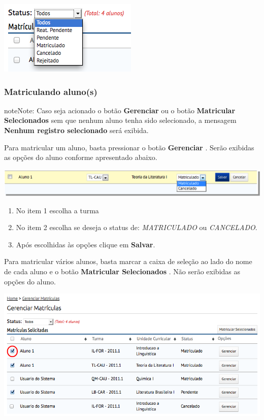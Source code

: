 \documentclass[letterpaper,10pt,english]{sphinxmanual}
\begin{document}
{\hfill\includegraphics{enrollment-manage-03.png}\hfill}


\subsubsection{Matriculando aluno(s)}
\label{enrollment:matriculando-aluno-s}
\begin{notice}{note}{Note:}
Caso seja acionado o botão \textbf{Gerenciar} ou o botão \textbf{Matricular Selecionados} sem que nenhum aluno tenha sido selecionado, a mensagem \textbf{Nenhum registro selecionado} será exibida.
\end{notice}

Para matricular um aluno, basta pressionar o botão \textbf{Gerenciar} . Serão exibidas as opções do aluno conforme apresentado abaixo.

{\includegraphics{enrollment-manage-04.png}\hfill}
\begin{enumerate}
\item {} 
No item 1 escolha a turma

\item {} 
No item 2 escolha se deseja o status de: \emph{MATRICULADO} ou \emph{CANCELADO}.

\item {} 
Após escolhidas às opções clique em \textbf{Salvar}.

\end{enumerate}

Para matricular vários alunos, basta marcar a caixa de seleção ao lado do nome de cada aluno e o botão \textbf{Matricular Selecionados} . Não serão exibidas as opções do aluno.

{\hfill\includegraphics{enrollment-manage-05.png}\hfill}
\end{document}

